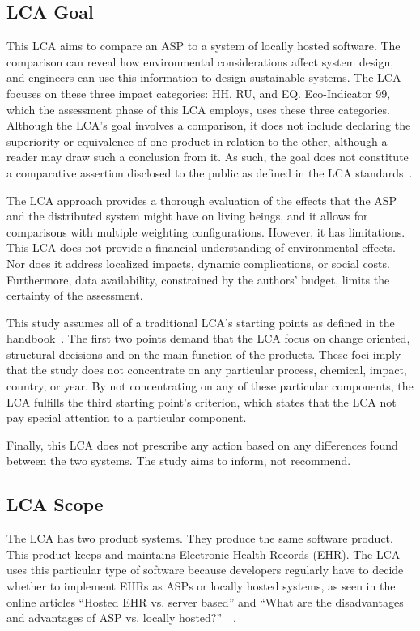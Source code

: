 \documentclass[final,journal,10pt,letterpaper,oneside,twocolumn,compsoc]%
{IEEEtran}
\begin{document}
\subsection{LCA Goal}
This LCA aims to compare an ASP to a system of
locally hosted software. The comparison can reveal how environmental
considerations affect system design, and engineers can use this
information to design sustainable systems. The LCA focuses
on these three impact categories: HH, RU, and EQ. Eco-Indicator 99, which the
assessment phase of this LCA  employs,
uses these three categories. Although the LCA's goal involves a comparison, it
does not include declaring the superiority or equivalence of one product in
relation to the other, although a reader may draw such a conclusion from it. As
such, the goal
does not constitute a comparative assertion disclosed to the public as defined
in the LCA standards~\cite{lca}.

The LCA approach provides a
thorough evaluation of the effects that the ASP and the distributed system might
have on living beings, and it allows for comparisons with multiple weighting
configurations. However, it has limitations. This LCA does not provide a
financial understanding
of environmental effects. Nor does it address localized impacts, dynamic
complications, or social costs. Furthermore, data availability, constrained by
the authors' budget, limits the certainty of the assessment. 

This study assumes all of a traditional LCA's starting points as defined in the
handbook~\cite{lca}. The first two points demand that the LCA
focus on change oriented, structural decisions and on the main
function of the
products. These foci imply that the study does not concentrate on any particular
process, chemical, impact, country, or year. By not concentrating on any of
these
particular components, the LCA fulfills the third starting point's criterion,
which states that the LCA not pay special attention to a particular component.

Finally, this LCA does not prescribe any action based on any differences found
between the two systems. The study aims to inform, not recommend.

\subsection{LCA Scope}
The LCA has two product systems. They produce the same software product. This
product keeps and maintains Electronic Health Records (EHR). The LCA uses this
particular type of software because developers regularly have to decide whether
to
implement EHRs as ASPs or locally hosted systems, as seen in the online articles
``Hosted EHR vs. server based'' and ``What are the disadvantages and
advantages of ASP vs. locally hosted?''~\cite{mds}~\cite{hrsa}.
\end{document}
